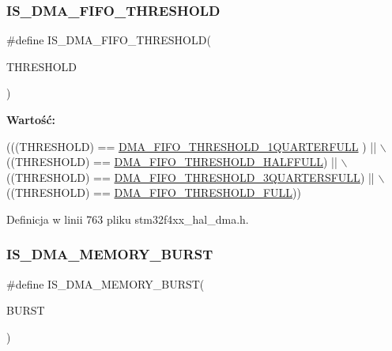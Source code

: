 \subsubsection{\texorpdfstring{I\+S\+\_\+\+D\+M\+A\+\_\+\+F\+I\+F\+O\+\_\+\+T\+H\+R\+E\+S\+H\+O\+LD}{IS\_DMA\_FIFO\_THRESHOLD}}
{\footnotesize\ttfamily \#define I\+S\+\_\+\+D\+M\+A\+\_\+\+F\+I\+F\+O\+\_\+\+T\+H\+R\+E\+S\+H\+O\+LD(\begin{DoxyParamCaption}\item[{}]{T\+H\+R\+E\+S\+H\+O\+LD }\end{DoxyParamCaption})}

{\bfseries Wartość\+:}
\begin{DoxyCode}
(((THRESHOLD) == \hyperlink{group___d_m_a___f_i_f_o__threshold__level_ga4debbd5733190b61b2115613d4b3658b}{DMA\_FIFO\_THRESHOLD\_1QUARTERFULL} ) || \(\backslash\)
                                          ((THRESHOLD) == 
      \hyperlink{group___d_m_a___f_i_f_o__threshold__level_gad2b071aa3a3bfc936017f12fb956c56f}{DMA\_FIFO\_THRESHOLD\_HALFFULL})      || \(\backslash\)
                                          ((THRESHOLD) == 
      \hyperlink{group___d_m_a___f_i_f_o__threshold__level_gae1e4ba12bae8440421e6672795d71223}{DMA\_FIFO\_THRESHOLD\_3QUARTERSFULL}) || \(\backslash\)
                                          ((THRESHOLD) == 
      \hyperlink{group___d_m_a___f_i_f_o__threshold__level_ga5de463bb24dc12fe7bbb300e1e4493f7}{DMA\_FIFO\_THRESHOLD\_FULL}))
\end{DoxyCode}


Definicja w linii 763 pliku stm32f4xx\+\_\+hal\+\_\+dma.\+h.

\mbox{\label{group___d_m_a___private___macros_ga921ebf06447dc036180fff50b7e4846a}} 
\subsubsection{\texorpdfstring{I\+S\+\_\+\+D\+M\+A\+\_\+\+M\+E\+M\+O\+R\+Y\+\_\+\+B\+U\+R\+ST}{IS\_DMA\_MEMORY\_BURST}}
{\footnotesize\ttfamily \#define I\+S\+\_\+\+D\+M\+A\+\_\+\+M\+E\+M\+O\+R\+Y\+\_\+\+B\+U\+R\+ST(\begin{DoxyParamCaption}\item[{}]{B\+U\+R\+ST }\end{DoxyParamCaption})}

